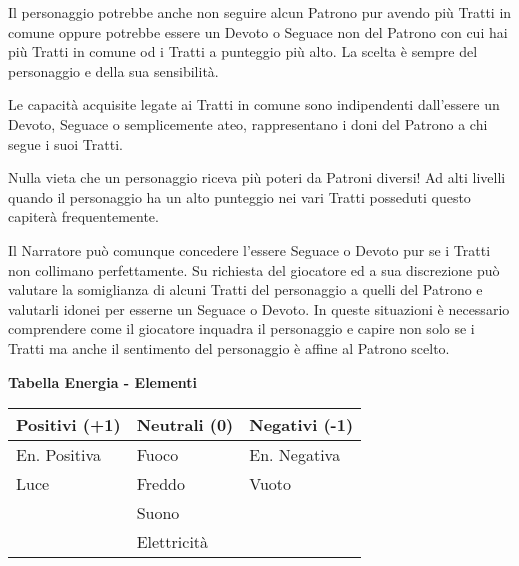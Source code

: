 \begin{multicols}{2}
Il personaggio potrebbe anche non seguire alcun Patrono pur avendo più Tratti in comune oppure potrebbe essere un Devoto o Seguace non del Patrono con cui hai più Tratti in comune od i Tratti a punteggio più alto. La scelta è sempre del personaggio e della sua sensibilità.

Le capacità acquisite legate ai Tratti in comune sono indipendenti dall'essere un Devoto, Seguace o semplicemente ateo, rappresentano i doni del Patrono a chi segue i suoi Tratti.

Nulla vieta che un personaggio riceva più poteri da Patroni diversi! Ad alti livelli quando il personaggio ha un alto punteggio nei vari Tratti posseduti questo capiterà frequentemente. 

\begin{changemargin}{0.3cm}{0.3cm}\begin{narratore}
Il Narratore può comunque concedere l'essere Seguace o Devoto pur se i Tratti non collimano perfettamente. Su richiesta del giocatore ed a sua discrezione può valutare la somiglianza di alcuni Tratti del personaggio a quelli del Patrono e valutarli idonei per esserne un Seguace o Devoto. In queste situazioni è necessario comprendere come il giocatore inquadra il personaggio e capire non solo se i Tratti ma anche il sentimento del personaggio è affine al Patrono scelto.
\end{narratore}\end{changemargin}


\medskip

\textbf{Tabella Energia - Elementi}

\medskip

\begin{tabular}{lll}
\textbf{Positivi} (+1) & \textbf{Neutrali} (0) & \textbf{Negativi} (-1)\\
\toprule
En. Positiva& Fuoco& En. Negativa\\
Luce & Freddo& Vuoto\\
& Suono & \\
& Elettricità &
\end{tabular}


\end{multicols}
